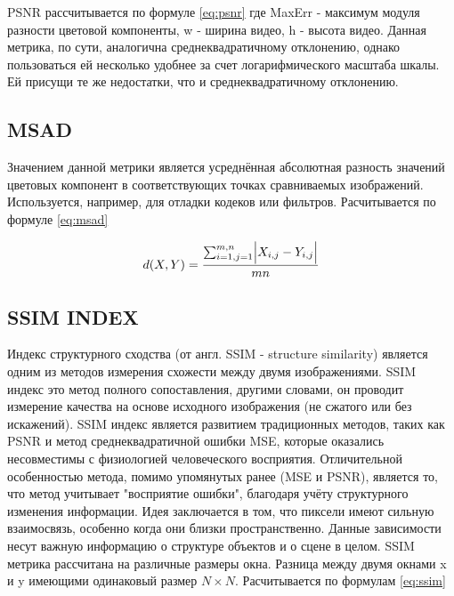 PSNR рассчитывается по формуле \ref{eq:psnr} где MaxErr - максимум модуля разности цветовой компоненты, w - ширина видео, h - высота видео. 
Данная метрика, по сути, аналогична среднеквадратичному отклонению, однако пользоваться ей несколько удобнее за счет логарифмического масштаба шкалы. 
Ей присущи те же недостатки, что и среднеквадратичному отклонению.

\subsection{MSAD}

Значением данной метрики является усреднённая абсолютная разность значений цветовых компонент 
в соответствующих точках сравниваемых изображений. 
Используется, например, для отладки кодеков или фильтров. Расчитывается по формуле \ref{eq:msad}

\begin{equation}\label{eq:msad}
d(X,Y)= \frac{\sum_{i = 1, j = 1}^{m,n}\Bigl|X_{i,j}-Y_{i,j}\Bigr|}{mn}
\end{equation}

\subsection{SSIM INDEX}

Индекс структурного сходства (от англ. SSIM - structure similarity) является одним 
из методов измерения схожести между двумя изображениями. SSIM индекс это метод 
полного сопоставления, другими словами, он проводит измерение качества на 
основе исходного изображения (не сжатого или без искажений). SSIM индекс 
является развитием традиционных методов, таких как PSNR и метод среднеквадратичной 
ошибки MSE, которые оказались несовместимы с физиологией человеческого восприятия.
Отличительной особенностью метода, помимо упомянутых ранее (MSE и PSNR), является 
то, что метод учитывает "восприятие ошибки", благодаря учёту структурного изменения 
информации. Идея заключается в том, что пиксели имеют сильную взаимосвязь, 
особенно когда они близки пространственно. Данные зависимости несут важную информацию о 
структуре объектов и о сцене в целом.
SSIM метрика рассчитана на различные размеры окна. 
Разница между двумя окнами x и y имеющими одинаковый размер $N \times N$. Расчитывается по формулам 
\ref{eq:ssim}

